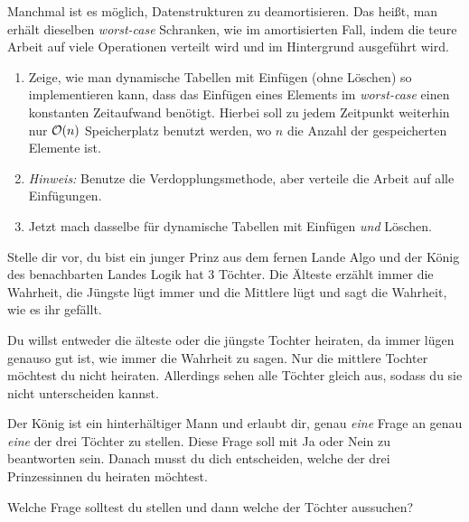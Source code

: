\documentclass{uebung_cs}
\begin{document}
\begin{exercise}
	Manchmal ist es möglich, Datenstrukturen zu deamortisieren. Das heißt, man erhält dieselben \emph{worst-case} Schranken, wie im amortisierten Fall, indem die teure Arbeit auf viele Operationen verteilt wird und im Hintergrund ausgeführt wird.

	\begin{enumerate}
		\item
	Zeige, wie man dynamische Tabellen mit Einfügen (ohne Löschen) so implementieren kann, dass das Einfügen eines Elements im \emph{worst-case} einen konstanten Zeitaufwand benötigt. Hierbei soll zu jedem Zeitpunkt weiterhin nur $\mathcal{O}(n)$ Speicherplatz benutzt werden, wo $n$ die Anzahl der gespeicherten Elemente ist.
	
	\item[]
	\textit{Hinweis:} Benutze die Verdopplungsmethode, aber verteile die Arbeit auf alle Einfügungen.

	\item Jetzt mach dasselbe für dynamische Tabellen mit Einfügen \emph{und} Löschen.
	\end{enumerate}
\end{exercise}

\begin{exercise}[Puzzle der Woche: Prinzessinnen]
	Stelle dir vor, du bist ein junger Prinz aus dem fernen Lande Algo und der König des benachbarten Landes Logik hat 3 Töchter. Die Älteste erzählt immer die Wahrheit, die Jüngste lügt immer und die Mittlere lügt und sagt die Wahrheit, wie es ihr gefällt.
	
	Du willst entweder die älteste oder die jüngste Tochter heiraten, da immer lügen genauso gut ist, wie immer die Wahrheit zu sagen. Nur die mittlere Tochter möchtest du nicht heiraten. Allerdings sehen alle Töchter gleich aus, sodass du sie nicht unterscheiden kannst.

	Der König ist ein hinterhältiger Mann und erlaubt dir, genau \textit{eine} Frage an genau \textit{eine} der drei Töchter zu stellen. Diese Frage soll mit \glqq Ja\grqq{} oder \glqq Nein\grqq{} zu beantworten sein. Danach musst du dich entscheiden, welche der drei Prinzessinnen du heiraten möchtest. 

	Welche Frage solltest du stellen und dann welche der Töchter aussuchen?
\end{exercise}
\end{document}

